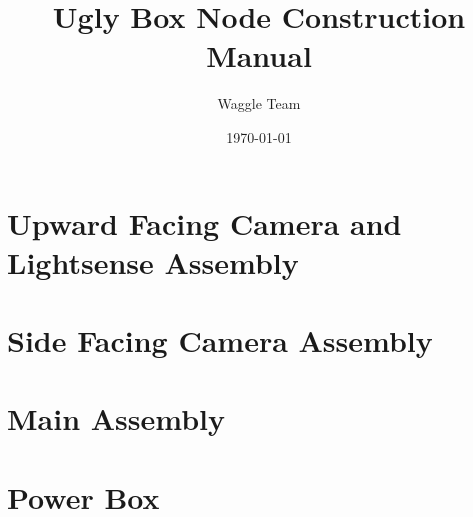 \documentclass{article}
\title{Ugly Box Node Construction Manual}
\author{Waggle Team}
\date{\today}
\begin{document}
\maketitle

\newpage

\section{Upward Facing Camera and Lightsense Assembly}

\clearpage

\section{Side Facing Camera Assembly}

\clearpage

\section{Main Assembly}

\clearpage

\section{Power Box}

\clearpage
\end{document}
